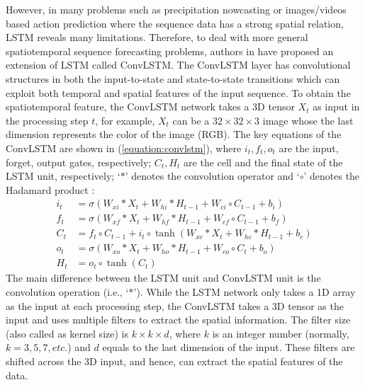 However, in many problems such as precipitation nowcasting \cite{xingjian2015convolutional} or images/videos based action prediction where the sequence data has a strong spatial relation, LSTM reveals many limitations. Therefore, to deal with more general spatiotemporal sequence forecasting problems, authors in \cite{xingjian2015convolutional} have proposed an extension of LSTM called ConvLSTM. The ConvLSTM layer has convolutional structures in both the input-to-state and state-to-state transitions which can exploit both temporal and spatial features of the input sequence. To obtain the spatiotemporal feature, the ConvLSTM network takes a 3D tensor $X_t$ as input in the processing step $t$, for example, $X_t$ can be a $32 \times 32 \times 3$ image whose the last dimension represents the color of the image (RGB). The key equations of the ConvLSTM are shown in (\ref{equation:convlstm}), where $i_t, f_t, o_t$ are the input, forget, output gates, respectively; $C_t, H_t$ are the cell and the final state of the LSTM unit, respectively; `$*$' denotes the convolution operator and `$\circ$' denotes the Hadamard product \cite{xingjian2015convolutional}:
\begin{equation}
\label{equation:convlstm}
\begin{aligned}
i_t &= \sigma(W_{xi}*X_t + W_{hi}*H_{t-1} + W_{ci}\circ C_{t-1} + b_i) \\
f_t &= \sigma(W_{xf}*X_t + W_{hf}*H_{t-1} + W_{cf}\circ C_{t-1} + b_f) \\
C_t &= f_t\circ C_{t-1} + i_t\circ \tanh(W_{xc}*X_t + W_{hc}*H_{t-1} + b_c) \\
o_t &= \sigma(W_{xo}*X_t + W_{ho}*H_{t-1} + W_{co}\circ C_{t} + b_o) \\
H_t &= o_t \circ \tanh(C_t)
\end{aligned}
\end{equation}
The main difference between the LSTM unit and ConvLSTM unit is the convolution operation (i.e., `$*$'). While the LSTM network only takes a 1D array as the input at each processing step, the ConvLSTM takes a 3D tensor as the input and uses multiple filters to extract the spatial information. The filter size (also called as kernel size) is $k \times k \times d$, where $k$ is an integer number (normally, $k=3,5,7,etc.$) and $d$ equals to the last dimension of the input. These filters are shifted across the 3D input, and hence, can extract the spatial features of the data.
